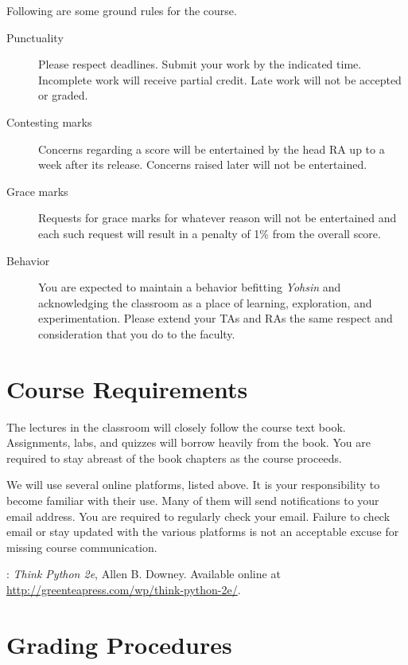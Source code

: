 \documentclass[a4paper]{article}
\begin{document}
Following are some ground rules for the course.
\begin{description}
\item[Punctuality] Please respect deadlines. Submit your work by the indicated time. Incomplete work will receive partial credit. Late work will not be accepted or graded.
\item[Contesting marks] Concerns regarding a score will be entertained by the head RA up to a week after its release. Concerns raised later will not be entertained.
\item[Grace marks] Requests for grace marks for whatever reason will not be entertained and each such request will result in a penalty of 1\% from the overall score.
\item[Behavior] You are expected to maintain a behavior befitting {\it Yohsin} and acknowledging the classroom as a place of learning, exploration, and experimentation. Please extend your TAs and RAs the same respect and consideration that you do to the faculty.
\end{description}

\section{Course Requirements}


The lectures in the classroom will closely follow the course text book. Assignments, labs, and quizzes will borrow heavily from the book. You are required to stay abreast of the book chapters as the course proceeds.

We will use several online platforms, listed above. It is your responsibility to become familiar with their use. Many of them will send notifications to your email address. You are required to regularly check your email. Failure to check email or stay updated with the various platforms is not an acceptable excuse for missing course communication.

: {\it Think Python 2e}, Allen B. Downey. Available online at \url{http://greenteapress.com/wp/think-python-2e/}.

\section{Grading Procedures}
\label{sec:grade}
\end{document}
